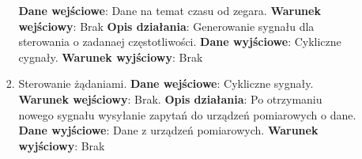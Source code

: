 \documentclass[11pt]{article}
\begin{document}
\begin{enumerate}
\begin{enumerate}[label*=\arabic*.]
\begin{enumerate}[label*=\arabic*.]
				\textbf{Dane wejściowe}: Dane na temat czasu od zegara.	\newline
				\textbf{Warunek wejściowy}:  Brak		\newline   	
				\textbf{Opis działania}: Generowanie sygnału dla sterowania o zadanaej częstotliwości.	\newline
				\textbf{Dane wyjściowe}: Cykliczne cygnały.	\newline
				\textbf{Warunek wyjściowy}: Brak
				\item Sterowanie żądaniami. \newline
				\textbf{Dane wejściowe}: Cykliczne sygnały.	\newline
				\textbf{Warunek wejściowy}: Brak.		\newline   	
				\textbf{Opis działania}: Po otrzymaniu nowego sygnału wysyłanie zapytań do urządzeń pomiarowych o dane.	\newline
				\textbf{Dane wyjściowe}: Dane z urządzeń pomiarowych.	\newline
				\textbf{Warunek wyjściowy}: Brak
			\end{enumerate}
		\end{enumerate}
	\end{enumerate}
\end{document}
